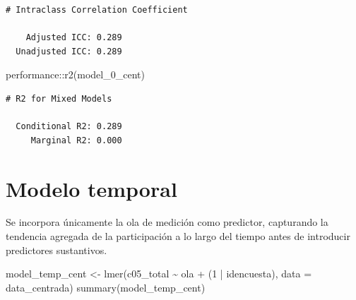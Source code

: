 \documentclass[
  spanish,
  a4paper,
  oneside]{scrbook}
\newenvironment{Shaded}{\begin{snugshade}}{\end{snugshade}}
\newcommand{\AttributeTok}[1]{\textcolor[rgb]{0.40,0.45,0.13}{#1}}
\newcommand{\DecValTok}[1]{\textcolor[rgb]{0.68,0.00,0.00}{#1}}
\newcommand{\FunctionTok}[1]{\textcolor[rgb]{0.28,0.35,0.67}{#1}}
\newcommand{\NormalTok}[1]{\textcolor[rgb]{0.00,0.23,0.31}{#1}}
\newcommand{\OtherTok}[1]{\textcolor[rgb]{0.00,0.23,0.31}{#1}}
\newcommand{\SpecialCharTok}[1]{\textcolor[rgb]{0.37,0.37,0.37}{#1}}
\begin{document}
\begin{verbatim}
# Intraclass Correlation Coefficient

    Adjusted ICC: 0.289
  Unadjusted ICC: 0.289
\end{verbatim}

\begin{Shaded}
\begin{Highlighting}[]
\NormalTok{performance}\SpecialCharTok{::}\FunctionTok{r2}\NormalTok{(model\_0\_cent)}
\end{Highlighting}
\end{Shaded}

\begin{verbatim}
# R2 for Mixed Models

  Conditional R2: 0.289
     Marginal R2: 0.000
\end{verbatim}

\section{Modelo temporal}\label{modelo-temporal}

Se incorpora únicamente la ola de medición como predictor, capturando la
tendencia agregada de la participación a lo largo del tiempo antes de
introducir predictores sustantivos.

\begin{Shaded}
\begin{Highlighting}[]
\NormalTok{model\_temp\_cent }\OtherTok{\textless{}{-}} \FunctionTok{lmer}\NormalTok{(c05\_total }\SpecialCharTok{\textasciitilde{}}\NormalTok{ ola }\SpecialCharTok{+}\NormalTok{ (}\DecValTok{1} \SpecialCharTok{|}\NormalTok{ idencuesta), }\AttributeTok{data =}\NormalTok{ data\_centrada)}
\FunctionTok{summary}\NormalTok{(model\_temp\_cent)}
\end{Highlighting}
\end{Shaded}
\end{document}
